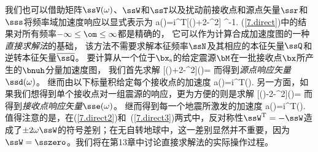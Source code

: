 我们也可以借助矩阵$\ssV(\omega)$、$\ssW$和$\ssT$以及扰动前接收点和源点矢量$\ssr$和$\sss$将频率域加速度响应以显式表示为
\eq
\label{7.direct}
a(\omega)=i\omega\ssr^{\rm T}[\ssV(\omega)+2\omega\ssW-\omega^2\ssT]
^{-1}\sss.
\en
(\ref{7.direct})中的结果对所有频率$-\infty\leq\om\leq\infty$都是精确的，
它可以作为计算合成加速度图的一种{\em 直接求解法}的基础，
%
该方法不需要求解本征频率$\ssN$及其相应的本征矢量$\ssQ$和逆转本征矢量$\overline{\ssQ}$。
要计算从一个位于$\bx_{\rm s}$的给定震源$\bM$在一批接收点$\bx$所产生的$\bnuh$分量加速度图，
我们首先求解
\eq
\label{7.direct2}
[\ssV(\omega)+2\omega\ssW-\omega^2\ssT]\ssd(\omega)=\sss
\en
而得到{\em 源点响应矢量\/}$\ssd(\omega)$。
%
%
继而由以下标量积给定每个接收点的加速度
\eq
a(\omega)=i\om\ssr^{\rm T}\ssd(\omega).
\en
另一方面，如果我们想得到单个接收点对一组震源的响应，更为方便的则是求解
\eq
\label{7.direct3}
[\ssV(\omega)-2\omega\ssW-\omega^2\ssT]\sse(\omega)=\ssr
\en
而得到{\em 接收点响应矢量\/}$\sse(\omega)$。
%
%
继而得到每一个地震所激发的加速度
\eq \label{7.direct4}
a(\omega)=i\om\sse^{\rm T}(\omega)\sss.
\en
值得注意的是，在(\ref{7.direct2})和~(\ref{7.direct3})两式中，反对称性$\ssW^{\rm T}=-\ssW$造成了$\pm2\omega\ssW$的符号差别；在无自转地球中，这一差别显然并不重要，因为$\ssW=\sszero$。我们将在第13章中讨论直接求解法的实际操作过程。
%
%

